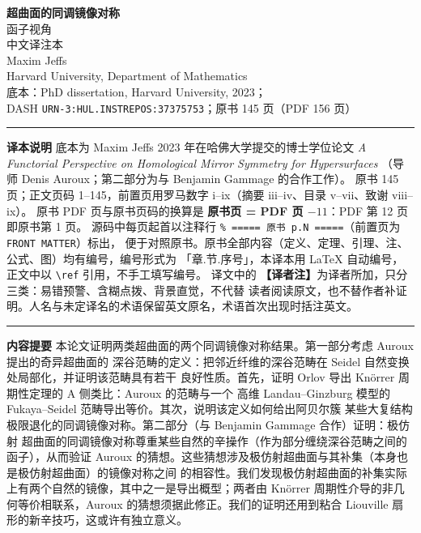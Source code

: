 




\begin{center}
  {\LARGE\bfseries 超曲面的同调镜像对称}\\[0.5em]
  {\large 函子视角}\\[1.0em]
  {\large 中文译注本}\\[1.0em]
  {\large Maxim Jeffs}\\[0.3em]
  {\small Harvard University, Department of Mathematics}\\[1.0em]
  {\small 底本：PhD dissertation, Harvard University, 2023；\\
  DASH \texttt{URN-3:HUL.INSTREPOS:37375753}；原书 145 页（PDF 156 页）}
\end{center}

\vspace{0.6em}
\noindent\rule{\textwidth}{0.4pt}
\begin{minipage}{\textwidth}
\small
\textbf{译本说明}\quad
底本为 Maxim Jeffs 2023 年在哈佛大学提交的博士学位论文
\emph{A Functorial Perspective on Homological Mirror Symmetry for Hypersurfaces}
（导师 Denis Auroux；第二部分为与 Benjamin Gammage 的合作工作）。
原书 145 页；正文页码 1--145，前置页用罗马数字 i--ix（摘要 iii--iv、目录 v--vii、致谢 viii--ix）。
原书 PDF 页与原书页码的换算是 \textbf{原书页 = PDF 页 $-11$}：PDF 第 12 页即原书第 1 页。
源码中每页起首以注释行 \texttt{\% ===== 原书 p.N =====}（前置页为 \texttt{FRONT MATTER}）标出，
便于对照原书。原书全部内容（定义、定理、引理、注、公式、图）均有编号，编号形式为
「章.节.序号」，本译本用 \LaTeX{} 自动编号，正文中以 \verb|\ref| 引用，不手工填写编号。
译文中的 \textbf{【译者注】}为译者所加，只分三类：易错预警、含糊点拨、背景直觉，不代替
读者阅读原文，也不替作者补证明。人名与未定译名的术语保留英文原名，术语首次出现时括注英文。
\end{minipage}
\noindent\rule{\textwidth}{0.4pt}

\vspace{1.2em}
\noindent\textbf{内容提要}\quad
本论文证明两类超曲面的两个同调镜像对称结果。第一部分考虑 Auroux 提出的奇异超曲面的
深谷范畴的定义：把邻近纤维的深谷范畴在 Seidel 自然变换处局部化，并证明该范畴具有若干
良好性质。首先，证明 Orlov 导出 Kn\"orrer 周期性定理的 A 侧类比：Auroux 的范畴与一个
高维 Landau--Ginzburg 模型的 Fukaya--Seidel 范畴导出等价。其次，说明该定义如何给出阿贝尔簇
某些大复结构极限退化的同调镜像对称。第二部分（与 Benjamin Gammage 合作）证明：极仿射
超曲面的同调镜像对称尊重某些自然的辛操作（作为部分缠绕深谷范畴之间的函子），从而验证
Auroux 的猜想。这些猜想涉及极仿射超曲面与其补集（本身也是极仿射超曲面）的镜像对称之间
的相容性。我们发现极仿射超曲面的补集实际上有两个自然的镜像，其中之一是导出概型；两者由
Kn\"orrer 周期性介导的非几何等价相联系，Auroux 的猜想须据此修正。我们的证明还用到粘合
Liouville 扇形的新辛技巧，这或许有独立意义。

